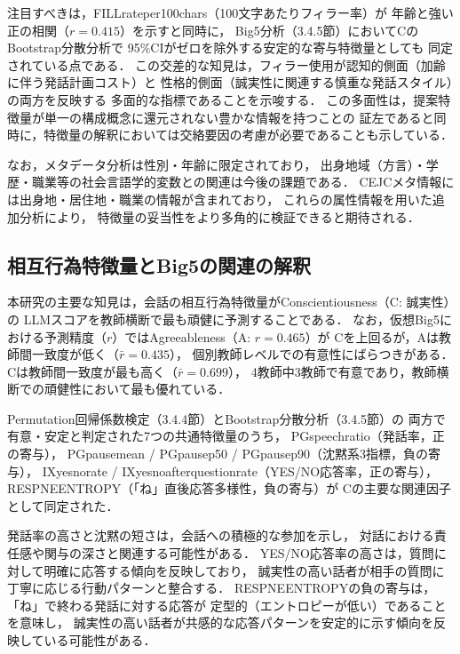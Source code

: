 \documentclass[dvipdfmx,11pt,a4paper]{bxjsarticle}
\renewcommand{\_}{\paperorigunderscore\allowbreak}%
\begin{document}
注目すべきは，FILL\_rate\_per\_100chars（100文字あたりフィラー率）が
年齢と強い正の相関（$r = 0.415$）を示すと同時に，
Big5分析（3.4.5節）においてCのBootstrap分散分析で
95\%CIがゼロを除外する安定的な寄与特徴量としても
同定されている点である．
この交差的な知見は，フィラー使用が認知的側面（加齢に伴う発話計画コスト）と
性格的側面（誠実性に関連する慎重な発話スタイル）の両方を反映する
多面的な指標であることを示唆する．
この多面性は，提案特徴量が単一の構成概念に還元されない豊かな情報を持つことの
証左であると同時に，特徴量の解釈においては交絡要因の考慮が必要であることも示している．

なお，メタデータ分析は性別・年齢に限定されており，
出身地域（方言）・学歴・職業等の社会言語学的変数との関連は今後の課題である．
CEJCメタ情報には出身地・居住地・職業の情報が含まれており，
これらの属性情報を用いた追加分析により，
特徴量の妥当性をより多角的に検証できると期待される．

\subsection{相互行為特徴量とBig5の関連の解釈}

本研究の主要な知見は，会話の相互行為特徴量がConscientiousness（C: 誠実性）の
LLMスコアを教師横断で最も頑健に予測することである．
なお，仮想Big5における予測精度（$r$）ではAgreeableness（A: $r = 0.465$）が
Cを上回るが，Aは教師間一致度が低く（$\bar{r} = 0.435$），
個別教師レベルでの有意性にばらつきがある．
Cは教師間一致度が最も高く（$\bar{r} = 0.699$），
4教師中3教師で有意であり，教師横断での頑健性において最も優れている．

Permutation回帰係数検定（3.4.4節）とBootstrap分散分析（3.4.5節）の
両方で有意・安定と判定された7つの共通特徴量のうち，
PG\_speech\_ratio（発話率，正の寄与），
PG\_pause\_mean / PG\_pause\_p50 / PG\_pause\_p90（沈黙系3指標，負の寄与），
IX\_yesno\_rate / IX\_yesno\_after\_question\_rate（YES/NO応答率，正の寄与），
RESP\_NE\_ENTROPY（「ね」直後応答多様性，負の寄与）が
Cの主要な関連因子として同定された．

発話率の高さと沈黙の短さは，会話への積極的な参加を示し，
対話における責任感や関与の深さと関連する可能性がある．
YES/NO応答率の高さは，質問に対して明確に応答する傾向を反映しており，
誠実性の高い話者が相手の質問に丁寧に応じる行動パターンと整合する．
RESP\_NE\_ENTROPYの負の寄与は，「ね」で終わる発話に対する応答が
定型的（エントロピーが低い）であることを意味し，
誠実性の高い話者が共感的な応答パターンを安定的に示す傾向を反映している可能性がある．
\end{document}
